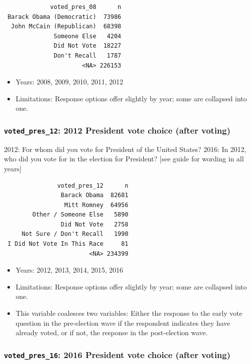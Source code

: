 \documentclass[10pt,article,oneside]{memoir}
\theoremstyle{definition}
\begin{document}
\begin{verbatim}
             voted_pres_08      n
 Barack Obama (Democratic)  73986
  John McCain (Republican)  68398
              Someone Else   4204
              Did Not Vote  18227
              Don't Recall   1787
                      <NA> 226153
\end{verbatim}

\begin{itemize}
\tightlist
\item
  Years: 2008, 2009, 2010, 2011, 2012
\item
  Limitations: Response options offer slightly by year; some are
  collapsed into one.
\end{itemize}

\subsubsection{\texorpdfstring{\texttt{voted\_pres\_12}: 2012 President
vote choice (after
voting)}{voted\_pres\_12: 2012 President vote choice (after voting)}}\label{voted_pres_12-2012-president-vote-choice-after-voting}

2012: For whom did you vote for President of the United States? 2016: In
2012, who did you vote for in the election for President? {[}see guide
for wording in all years{]}

\begin{verbatim}
               voted_pres_12      n
                Barack Obama  82681
                 Mitt Romney  64956
        Other / Someone Else   5890
                Did Not Vote   2758
     Not Sure / Don't Recall   1990
 I Did Not Vote In This Race     81
                        <NA> 234399
\end{verbatim}

\begin{itemize}
\tightlist
\item
  Years: 2012, 2013, 2014, 2015, 2016
\item
  Limitations: Response options offer slightly by year; some are
  collapsed into one.
\item
  This variable coalesces two variables: Either the response to the
  early vote question in the pre-election wave if the respondent
  indicates they have already voted, or if not, the response in the
  post-election wave.
\end{itemize}

\subsubsection{\texorpdfstring{\texttt{voted\_pres\_16}: 2016 President
vote choice (after
voting)}{voted\_pres\_16: 2016 President vote choice (after voting)}}\label{voted_pres_16-2016-president-vote-choice-after-voting}
\end{document}
